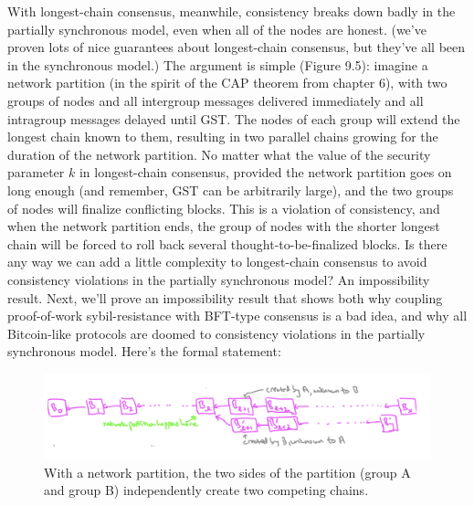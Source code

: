 With longest-chain consensus, meanwhile, consistency breaks down badly in the partially
synchronous model, even when all of the nodes are honest. (we've proven lots of nice
guarantees about longest-chain consensus, but they've all been in the synchronous model.)
The argument is simple (Figure 9.5): imagine a network partition (in the spirit of the CAP
theorem from chapter 6), with two groups of nodes and all intergroup messages delivered
immediately and all intragroup messages delayed until GST. The nodes of each group will
extend the longest chain known to them, resulting in two parallel chains growing for the
duration of the network partition. No matter what the value of the security parameter $k$ in
longest-chain consensus, provided the network partition goes on long enough (and remember,
GST can be arbitrarily large), and the two groups of nodes will finalize conflicting blocks. This is
a violation of consistency, and when the network partition ends, the group of nodes with the
shorter longest chain will be forced to roll back several thought-to-be-finalized blocks. Is
there any way we can add a little complexity to longest-chain consensus to avoid consistency
violations in the partially synchronous model?
An impossibility result. Next, we’ll prove an impossibility result that shows both why
coupling proof-of-work sybil-resistance with BFT-type consensus is a bad idea, and why
all Bitcoin-like protocols are doomed to consistency violations in the partially synchronous
model. Here’s the formal statement:

\begin{figure}[h]
    \centering
    \includegraphics[scale = 0.5]{figures/f37.png}
    \caption{With a network partition, the two sides of the partition (group A and group B)
independently create two competing chains.}
    \label{fig:mesh1}
\end{figure}\\


